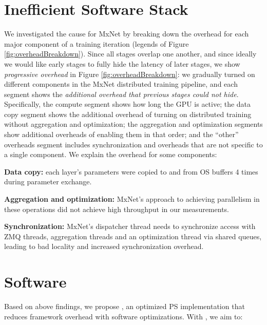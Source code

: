 \section{Inefficient Software Stack}

We investigated the cause for MxNet by breaking down the overhead for each major component of a training iteration (legends of Figure \ref{fig:overheadBreakdown}). Since all stages overlap one another, and since ideally we would like early stages to fully hide the latency of later stages, we show \textit{progressive overhead} in Figure \ref{fig:overheadBreakdown}: we gradually turned on different components in the MxNet distributed training pipeline, and each segment shows the \textit{additional overhead that previous stages could not hide}. Specifically, the compute segment shows how long the GPU is active; the data copy segment shows the additional overhead of turning on distributed training without aggregation and optimization; the aggregation and optimization segments show additional overheads of enabling them in that order; and the ``other'' overheads segment includes synchronization and overheads that are not specific to a single component. We explain the overhead for some components:

	\noindent\textbf{Data copy:} each layer's parameters were copied to and from OS buffers 4 times during parameter exchange.
\vspace{-0.1ex}	

	\noindent \textbf{Aggregation and optimization:} MxNet's approach to achieving parallelism in these operations did not achieve high throughput in our measurements.
\vspace{-0.1ex}	
	
	\noindent \textbf{Synchronization:} MxNet's dispatcher thread needs to synchronize access with ZMQ threads, aggregation threads and an optimization thread via shared queues, leading to bad locality and increased synchronization overhead. 
	
	
\section{\phub Software}
Based on above findings, we propose \phub, an optimized PS implementation that reduces framework overhead with software optimizations. With \phub, we aim to:


